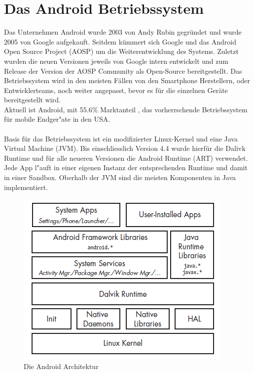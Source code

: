 
\section{Das Android Betriebssystem}
	Das Unternehmen Android wurde 2003 von Andy Rubin gegründet und wurde 2005 von Google aufgekauft. Seitdem kümmert sich Google und das Android Open Source Project (AOSP) um die Weiterentwicklung des Systems. Zuletzt wurden die neuen Versionen jeweils von Google intern entwickelt und zum Release der Version der AOSP Community als Open-Source bereitgestellt. Das Betriebssystem wird in den meisten Fällen von den Smartphone Herstellern, oder Entwicklerteams, noch weiter angepasst, bevor es für die einzelnen Geräte bereitgestellt wird.\\
	Aktuell ist Android, mit 55.6\% Marktanteil \cite{MobileOsStat}, das vorherrschende Betriebssystem für mobile Endger"ate in den USA.
	\\\\
	Basis für das Betriebssystem ist ein modifizierter Linux-Kernel und eine Java Virtual Machine (JVM). Bis einschliesslich Version 4.4 wurde hierfür die Dalivk Runtime und für alle neueren Versionen die Android Runtime (ART) verwendet. Jede App l"auft in einer eigenen Instanz der entsprechenden Runtime und damit in einer Sandbox.\newline
	Oberhalb der JVM sind die meisten Komponenten in Java implementiert.\\
	
	\begin{figure}[h]
		\centering
		\includegraphics[width=0.7\linewidth]{android_pages/graphics/architektur_android_.png}
		\caption{Die Android Architektur \protect\cite{Elenkov2014} }
		\label{fig:architektur_android}
	\end{figure}
	
